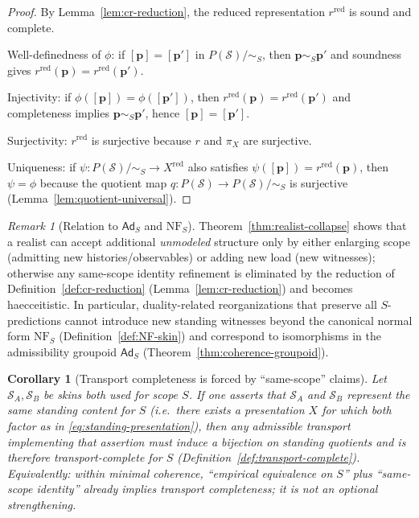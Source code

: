 \documentclass[11pt]{article}
\newtheorem{corollary}[definition]{Corollary}
\theoremstyle{remark}
\newtheorem{remark}[definition]{Remark}
\newcommand{\Skin}{\mathcal{S}}
\newcommand{\Ad}{\ensuremath{\mathsf{Ad}}}
\begin{document}
\begin{proof}
By Lemma~\ref{lem:cr-reduction}, the reduced representation $r^{\mathrm{red}}$ is sound and complete.

Well-definedness of $\phi$: if $[\mathbf{p}]=[\mathbf{p}']$ in $P(\Skin)/\!\sim_S$, then $\mathbf{p}\sim_S\mathbf{p}'$
and soundness gives $r^{\mathrm{red}}(\mathbf{p})=r^{\mathrm{red}}(\mathbf{p}')$.

Injectivity: if $\phi([\mathbf{p}])=\phi([\mathbf{p}'])$, then
$r^{\mathrm{red}}(\mathbf{p})=r^{\mathrm{red}}(\mathbf{p}')$ and completeness implies $\mathbf{p}\sim_S\mathbf{p}'$,
hence $[\mathbf{p}]=[\mathbf{p}']$.

Surjectivity: $r^{\mathrm{red}}$ is surjective because $r$ and $\pi_X$ are surjective.

Uniqueness: if $\psi:P(\Skin)/\!\sim_S\to X^{\mathrm{red}}$ also satisfies $\psi([\mathbf{p}])=r^{\mathrm{red}}(\mathbf{p})$,
then $\psi=\phi$ because the quotient map $q:P(\Skin)\to P(\Skin)/\!\sim_S$ is surjective
(Lemma~\ref{lem:quotient-universal}).
\end{proof}


\begin{remark}[Relation to $\Ad_S$ and $\mathrm{NF}_S$]\label{rem:cr-nf}
Theorem~\ref{thm:realist-collapse} shows that a realist can accept additional \emph{unmodeled} structure only by
either enlarging scope (admitting new histories/observables) or adding new load (new witnesses); otherwise any
same-scope identity refinement is eliminated by the reduction of Definition~\ref{def:cr-reduction} (Lemma~\ref{lem:cr-reduction}) and becomes haecceitistic.
In particular, duality-related reorganizations that preserve all $S$-predictions cannot introduce new standing
witnesses beyond the canonical normal form $\mathrm{NF}_S$ (Definition~\ref{def:NF-skin}) and correspond to
isomorphisms in the admissibility groupoid $\Ad_S$ (Theorem~\ref{thm:coherence-groupoid}).
\end{remark}



\begin{corollary}[Transport completeness is forced by ``same-scope'' claims]\label{cor:transport-forced}
Let $\Skin_A,\Skin_B$ be skins both used for scope $S$.
If one asserts that $\Skin_A$ and $\Skin_B$ represent the \emph{same} standing content for $S$
(i.e.\ there exists a presentation $X$ for which both factor as in \eqref{eq:standing-presentation}),
then any admissible transport implementing that assertion must induce a bijection on standing quotients
and is therefore transport-complete for $S$ (Definition~\ref{def:transport-complete}).
Equivalently: within minimal coherence, ``empirical equivalence on $S$'' plus ``same-scope identity''
already implies transport completeness; it is not an optional strengthening.
\end{corollary}
\end{document}
